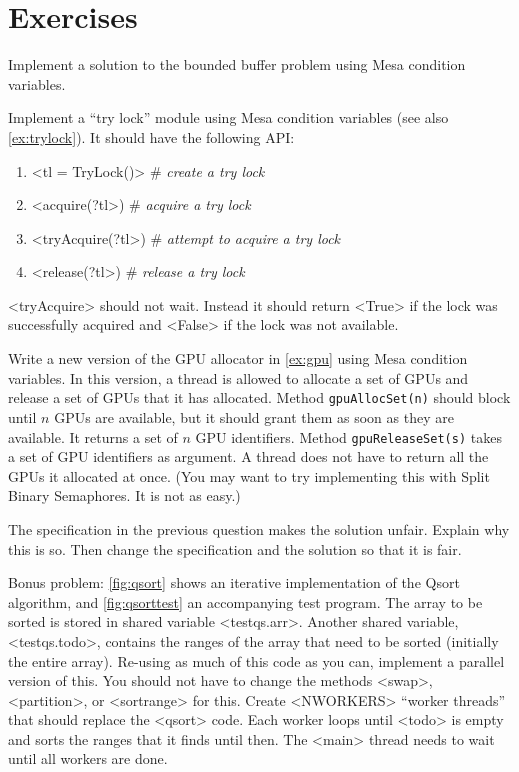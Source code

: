 \documentclass{report}
\begin{document}
\section*{Exercises}
\begin{problems}
\item \label{ex:bbmesa} Implement a solution to the bounded buffer problem using Mesa condition
variables.
\item Implement a ``try lock'' module using Mesa condition variables
(see also \autoref{ex:trylock}).  It should
have the following API:
\begin{enumerate}
\item <{tl = TryLock()}> \# \emph{create a try lock}
\item <{acquire(?tl}>) \# \emph{acquire a try lock}
\item <{tryAcquire(?tl}>) \# \emph{attempt to acquire a try lock}
\item <{release(?tl}>) \# \emph{release a try lock}
\end{enumerate}
\noindent
<{tryAcquire}> should not wait.
Instead it should return <{True}> if the lock was successfully
acquired and <{False}> if the lock was not available.
\item Write a new version of the GPU allocator in \autoref{ex:gpu}
using Mesa condition variables.
In this version,
a thread is allowed to allocate a set of GPUs and release a set of GPUs that it
has allocated.  Method \texttt{gpuAllocSet(n)} should block until $n$ GPUs are
available, but it should grant them as soon as they are available.
It returns a set of $n$ GPU identifiers.
Method \texttt{gpuReleaseSet(s)} takes a set of GPU identifiers as argument.
A thread does not have to return all the GPUs it allocated at once.
(You may want to try implementing this with Split Binary Semaphores.  It is not as easy.)
\item The specification in the previous question makes the solution unfair.
Explain why this is so.  Then change the specification and the solution so that
it is fair.
\item \label{ex:qsort}
Bonus problem: \autoref{fig:qsort} shows an iterative implementation of the Qsort
algorithm, and \autoref{fig:qsorttest} an accompanying test program.
The array to be sorted is stored in shared variable <{testqs.arr}>.
Another shared variable, <{testqs.todo}>, contains the ranges of the
array that need to be sorted (initially the entire array).
Re-using as much of this code as you can, implement a parallel version of
this.  You should not have to change the methods <{swap}>, <{partition}>,
or <{sortrange}> for this.  Create <{NWORKERS}> ``worker threads''
that should replace the <{qsort}> code.
Each worker loops until <{todo}>
is empty and sorts the ranges that it finds until then.  The <{main}>
thread needs to wait until all workers are done.
\end{problems}
\end{document}
